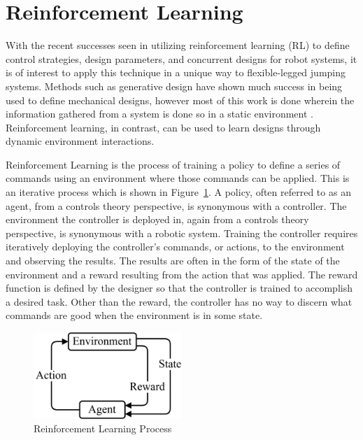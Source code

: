 \section{Reinforcement Learning}
\label{sec:rl}
With the recent successes seen in utilizing reinforcement learning (RL) to define control strategies, design parameters, and concurrent designs for robot systems, it is of interest to apply this technique in a unique way to flexible-legged jumping systems. Methods such as generative design have shown much success in being used to define mechanical designs, however most of this work is done wherein the information gathered from a system is done so in a static environment \cite{doi:10.1504/IJDE.2017.085639, briard:hal-02948764}. Reinforcement learning, in contrast, can be used to learn designs through dynamic environment interactions.

Reinforcement Learning is the process of training a policy to define a series of commands using an environment where those commands can be applied. This is an iterative process which is shown in Figure~\ref{fig:rl_process}. A policy, often referred to as an agent, from a controls theory perspective, is synonymous with a controller. The environment the controller is deployed in, again from a controls theory perspective, is synonymous with a robotic system. Training the controller requires iteratively deploying the controller's commands, or actions, to the environment and observing the results. The results are often in the form of the state of the environment and a reward resulting from the action that was applied. The reward function is defined by the designer so that the controller is trained to accomplish a desired task. Other than the reward, the controller has no way to discern what commands are good when the environment is in some state.
% 
\begin{figure}[tb!]
  \centering
    \includegraphics[width=0.5\textwidth]{Figures/Ch1/RL_Flow_Chart.drawio.png}
    \caption{Reinforcement Learning Process}
    \label{fig:rl_process}
\end{figure}
%

